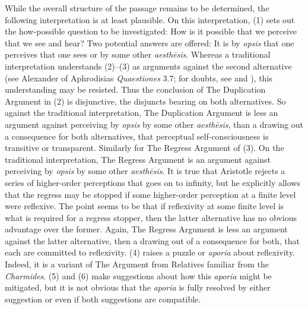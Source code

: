 

While the overall structure of the passage remains to be determined, the following interpretation is at least plausible. On this interpretation, (1) sets out the how-possible question to be investigated: How is it possible that we perceive that we see and hear? Two potential answers are offered: It is by \emph{opsis} that one perceives that one sees or by some other \emph{aesthēsis}. Whereas a traditional interpretation understands (2)–(3) as arguments against the second alternative (see Alexander of Aphrodisias \emph{Quaestiones} 3.7; for doubts, see \citealt{Kosman:2014ab} and \citealt{Osborne:1983le}), this understanding may be resisted. Thus the conclusion of The Duplication Argument in (2) is disjunctive, the disjuncts bearing on both alternatives. So against the traditional interpretation, The Duplication Argument is less an argument against perceiving by \emph{opsis} by some other \emph{aesthēsis}, than a drawing out a consequence for both alternatives, that perceptual self-consciousness is transitive or transparent. Similarly for The Regress Argument of (3). On the traditional interpretation, The Regress Argument is an argument against perceiving by \emph{opsis} by some other \emph{aesthēsis}. It is true that Aristotle rejects a series of higher-order perceptions that goes on to infinity, but he explicitly allows that the regress may be stopped if some higher-order perception at a finite level were reflexive. The point seems to be that if reflexivity at some finite level is what is required for a regress stopper, then the latter alternative has no obvious advantage over the former. Again, The Regress Argument is less an argument against the latter alternative, then a drawing out of a consequence for both, that each are committed to reflexivity. (4) raises a puzzle or \emph{aporia} about reflexivity. Indeed, it is a variant of The Argument from Relatives familiar from the \emph{Charmides}. (5) and (6) make suggestions about how this \emph{aporia} might be mitigated, but it is not obvious that the \emph{aporia} is fully resolved by either suggestion or even if both suggestions are compatible.


